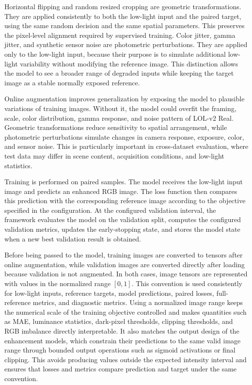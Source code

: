 Horizontal flipping and random resized cropping are geometric transformations. They are applied consistently to both the low-light input and the paired target, using the same random decision and the same spatial parameters. This preserves the pixel-level alignment required by supervised training. Color jitter, gamma jitter, and synthetic sensor noise are photometric perturbations. They are applied only to the low-light input, because their purpose is to simulate additional low-light variability without modifying the reference image. This distinction allows the model to see a broader range of degraded inputs while keeping the target image as a stable normally exposed reference.

Online augmentation improves generalization by exposing the model to plausible variations of training images. Without it, the model could overfit the framing, scale, color distribution, gamma response, and noise pattern of LOL-v2 Real. Geometric transformations reduce sensitivity to spatial arrangement, while photometric perturbations simulate changes in camera response, exposure, color, and sensor noise. This is particularly important in cross-dataset evaluation, where test data may differ in scene content, acquisition conditions, and low-light statistics.

Training is performed on paired samples. The model receives the low-light input image and predicts an enhanced RGB image. The loss function then compares this prediction with the corresponding reference image according to the objective specified in the configuration. At the configured validation interval, the framework evaluates the model on the validation split, computes the configured validation metrics, updates the early-stopping state, and stores the model state when a new best validation result is obtained.

Before being passed to the model, training images are converted to tensors after online augmentation, while validation images are converted directly after loading because validation is not augmented. In both cases, image tensors are represented with values in the normalized range $[0, 1]$. This convention is used consistently for low-light inputs, reference targets, model predictions, paired losses, full-reference metrics, and diagnostic metrics. Using a normalized image range keeps the numerical scale of the training objective controlled and makes quantities such as MAE, luminance statistics, dark-pixel thresholds, clipping thresholds, and RGB imbalance directly interpretable. It also matches the output design of the enhancement models, which constrain their predictions to the same valid image range through bounded output operations such as sigmoid activations or final clipping. This avoids producing values outside the expected intensity interval and ensures that losses and metrics compare prediction and target under the same convention.


